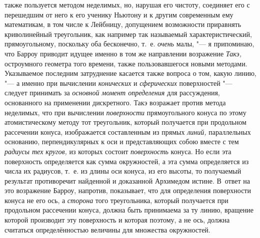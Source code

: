 также пользуется методом неделимых, но, нарушая его чистоту, соединяет его с
перешедшим от него к его ученику Ньютону и к другим современным ему
математикам, в том числе к Лейбницу, допущением возможности приравнять
криволинейный треугольник, как например так называемый характеристический,
прямоугольному, поскольку оба бесконечно, т.~е. {\em очень} малы, "--- я
припоминаю, что Барроу приводит идущее именно в том же направлении возражение
{\em Такэ,} остроумного геометра того времени, также пользовавшегося новыми
методами. Указываемое последним затруднение касается также вопроса о том, какую
линию, "--- а именно при вычислении {\em конических} и {\em сферических}
поверхностей "--- следует принимать за {\em основной момент определения} для
рассуждения, основанного на применении дискретного. Такэ возражает против
метода неделимых, что при вычислении {\em поверхности} прямоугольного конуса по
этому атомистическому методу тот треугольник, который получается при продольном
рассечении конуса, изображается составленным из прямых {\em линий,}
параллельных основанию, перпендикулярных к оси и представляющих собою вместе с
тем {\em радиусы тех кругов,} из которых состоит {\em поверхность} конуса. Но
если эта поверхность определяется как сумма окружностей, а эта сумма
определяется из числа их радиусов, т.~е. из длины оси конуса, из его высоты, то
получаемый результат противоречит найденной и доказанной Архимедом истине.
В~ответ на это возражение Барроу, напротив, показывает, что для определения
поверхности конуса не его ось, а {\em сторона} того треугольника, который
получается при продольном рассечении конуса, должна быть принимаема за ту
линию, вращение которой производит эту поверхность и которая поэтому, а не ось,
должна считаться определённостью величины для множества окружностей.

